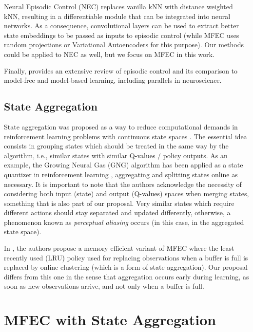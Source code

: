 \documentclass{article}
\begin{document}
Neural Episodic Control (NEC) \cite{pritzel2017neural} replaces vanilla kNN with distance weighted kNN, resulting in a differentiable module that can be integrated into neural networks. As a consequence, convolutional layers can be used to extract better state embeddings to be passed as inputs to episodic control (while MFEC uses random projections \cite{johnson1984extensions, bingham2001random} or Variational Autoencoders \cite{kingma2013auto} for this purpose). Our methods could be applied to NEC as well, but we focus on MFEC in this work.

Finally, \cite{gershman2017reinforcement} provides an extensive review of episodic control and its comparison to model-free and model-based learning, including parallels in neuroscience.

\subsection{State Aggregation}

State aggregation was proposed as a way to reduce computational demands in reinforcement learning problems with continuous state spaces \cite{singh1995reinforcement}. The essential idea consists in grouping states which should be treated in the same way by the algorithm, i.e., similar states with similar Q-values / policy outputs. As an example, the Growing Neural Gas (GNG) algorithm \cite{fritzke1995growing} has been applied as a state quantizer in reinforcement learning \cite{baumann2011state, baumann2012improved}, aggregating and splitting states online as necessary. It is important to note that the authors acknowledge the necessity of considering both input (state) and output (Q-values) spaces when merging states, something that is also part of our proposal. Very similar states which require different actions should stay separated and updated differently, otherwise, a phenomenon known as \emph{perceptual aliasing} \cite{chrisman1992reinforcement} occurs (in this case, in the aggregated state space).

In \cite{agostinelli2019memory}, the authors propose a memory-efficient variant of MFEC where the least recently used (LRU) policy used for replacing observations when a buffer is full is replaced by online clustering (which is a form of state aggregation). Our proposal differs from this one in the sense that aggregation occurs early during learning, as soon as new observations arrive, and not only when a buffer is full.


\section{MFEC with State Aggregation}
\label{sec:samfec}
\end{document}
